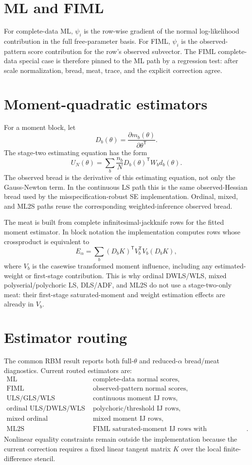 \documentclass[11pt]{article}
\newcommand{\T}{^{\mathsf T}}
\begin{document}
\section*{ML and FIML}

For complete-data ML, \(\psi_i\) is the row-wise gradient of the normal
log-likelihood contribution in the full free-parameter basis. For FIML,
\(\psi_i\) is the observed-pattern score contribution for the row's observed
subvector. The FIML complete-data special case is therefore pinned to the ML
path by a regression test: after scale normalization, bread, meat, trace, and
the explicit correction agree.

\section*{Moment-quadratic estimators}

For a moment block, let
\[
  D_b(\theta) = \frac{\partial m_b(\theta)}{\partial\theta\T}.
\]
The stage-two estimating equation has the form
\[
  U_N(\theta) =
    \sum_b \frac{n_b}{N} D_b(\theta)\T W_b d_b(\theta).
\]
The observed bread is the derivative of this estimating equation, not only the
Gauss-Newton term. In the continuous LS path this is the same observed-Hessian
bread used by the misspecification-robust SE implementation. Ordinal, mixed,
and ML2S paths reuse the corresponding weighted-inference observed bread.

The meat is built from complete infinitesimal-jackknife rows for the fitted
moment estimator. In block notation the implementation computes rows whose
crossproduct is equivalent to
\[
  E_\alpha =
    \sum_b (D_b K)\T V_b\T V_b (D_b K),
\]
where \(V_b\) is the casewise transformed moment influence, including any
estimated-weight or first-stage contribution. This is why ordinal DWLS/WLS,
mixed polyserial/polychoric LS, DLS/ADF, and ML2S do not use a stage-two-only
meat: their first-stage saturated-moment and weight estimation effects are
already in \(V_b\).

\section*{Estimator routing}

The common RBM result reports both full-\(\theta\) and reduced-\(\alpha\)
bread/meat diagnostics. Current routed estimators are:
\[
\begin{array}{ll}
\text{ML} & \text{complete-data normal scores},\\
\text{FIML} & \text{observed-pattern normal scores},\\
\text{ULS/GLS/WLS} & \text{continuous moment IJ rows},\\
\text{ordinal ULS/DWLS/WLS} & \text{polychoric/threshold IJ rows},\\
\text{mixed ordinal ULS/DWLS/WLS} & \text{mixed moment IJ rows},\\
\text{ML2S} & \text{FIML saturated-moment IJ rows with NT/DWLS/ADF/DLS weights}.
\end{array}
\]
Nonlinear equality constraints remain outside the implementation because the
current correction requires a fixed linear tangent matrix \(K\) over the local
finite-difference stencil.
\end{document}
